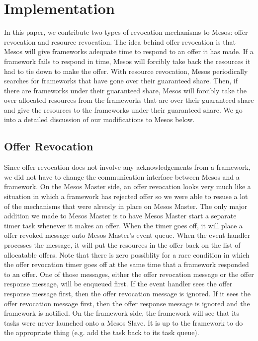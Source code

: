 \section{Implementation}
In this paper, we contribute two types of revocation mechanisms to Mesos: offer revocation and resource
revocation. The idea behind offer revocation is that Mesos will give frameworks adequate time to respond
to an offer it has made. If a framework fails to respond in time, Mesos will forcibly take back the
resources it had to tie down to make the offer. With resource revocation, Mesos periodically searches
for frameworks that have gone over their guaranteed share. Then, if there are frameworks under their
guaranteed share, Mesos will forcibly take the over allocated resources from the frameworks that are
over their guaranteed share and give the resources to the frameworks under their guaranteed share. We
go into a detailed discussion of our modifications to Mesos below.

\subsection{Offer Revocation}
Since offer revocation does not involve any acknowledgements from a framework, we did not have to change
the communication interface between Mesos and a framework. On the Mesos Master side, an offer revocation
looks very much like a situation in which a framework has rejected offer so we were able to resuse a
lot of the mechanisms that were already in place on Mesos Master. The only major addition we made to
Mesos Master is to have Mesos Master start a separate timer task whenever it makes an offer. When the
timer goes off, it will place a offer revoked message onto Mesos Master's event queue. When the event
handler processes the message, it will put the resources in the offer back on the list of allocatable
offers. Note that there is zero possiblity for a race condition in which the offer revocation timer goes
off at the same time that a framework responded to an offer. One of those messages, either the offer
revocation message or the offer response message, will be enqueued first. If the event handler sees 
the offer response message first, then the offer revocation message is ignored. If it sees the offer
revocation message first, then the offer response message is ignored and the framework is notified. On
the framework side, the framework will see that its tasks were never launched onto a Mesos Slave. It
is up to the framework to do the appropriate thing (e.g. add the task back to its task queue).

